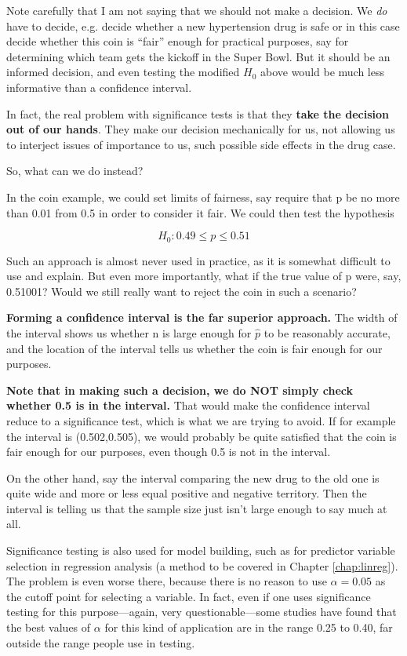 Note carefully that I am not saying that we should not make a decision.
We {\it do} have to decide, e.g. decide whether a new hypertension drug
is safe or in this case decide whether this coin is ``fair'' enough for
practical purposes, say for determining which team gets the kickoff in
the Super Bowl.  But it should be an informed decision, and even testing
the modified $H_0$ above would be much less informative than a
confidence interval.

In fact, the real problem with significance tests is that they {\bf take
the decision out of our hands}.  They make our decision mechanically for
us, not allowing us to interject issues of importance to us, such
possible side effects in the drug case.

So, what can we do instead?

In the coin example, we could set limits of fairness, say require that p
be no more than 0.01 from 0.5 in order to consider it fair.  We could
then test the hypothesis

\begin{equation}
H_0:  0.49 \leq p \leq 0.51
\end{equation}

Such an approach is almost never used in practice, as it is somewhat
difficult to use and explain.  But even more importantly, what if the
true value of p were, say, 0.51001?  Would we still really want to
reject the coin in such a scenario?

{\bf Forming a confidence interval is the far superior approach.}  The width
of the interval shows us whether n is large enough for $\widehat{p}$ to be
reasonably accurate, and the location of the interval tells us whether
the coin is fair enough for our purposes.

{\bf Note that in making such a decision, we do NOT simply check whether
0.5 is in the interval.}  That would make the confidence interval reduce
to a significance test, which is what we are trying to avoid.  If for
example the interval is (0.502,0.505), we would probably be quite
satisfied that the coin is fair enough for our purposes, even though 0.5
is not in the interval.

On the other hand, say the interval comparing the new drug to the old
one is quite wide and more or less equal positive and negative
territory.  Then the interval is telling us that the sample size just
isn't large enough to say much at all.

Significance testing is also used for model building, such as for
predictor variable selection in regression analysis (a method to be
covered in Chapter \ref{chap:linreg}).  The problem is even worse there,
because there is no reason to use $\alpha = 0.05$ as the cutoff point
for selecting a variable.  In fact, even if one uses significance
testing for this purpose---again, very questionable---some studies have
found that the best values of $\alpha$ for this kind of application are
in the range 0.25 to 0.40, far outside the range people use in testing.


